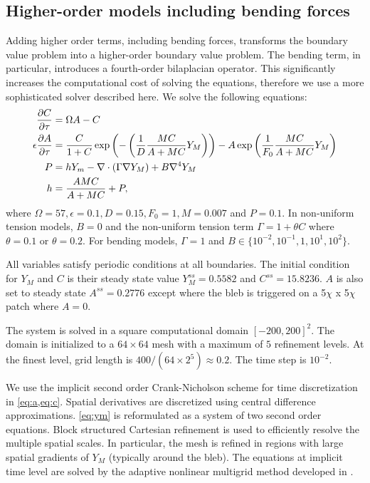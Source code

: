 \subsection{Higher-order models including bending forces}
Adding higher order terms, including bending forces, transforms the boundary value problem into a higher-order boundary value problem. The bending term, in particular, introduces a fourth-order bilaplacian operator. This significantly increases the computational cost of solving the equations, therefore we use a more sophisticated solver described here. 
We solve the following equations:
\begin{align}
\displaystyle{\frac{{\partial C}}{{\partial \tau}}}&=\Omega A-C \label{eq:c} \\
\epsilon \displaystyle{\frac{{\partial A}}{{\partial \tau}}}&=\displaystyle{\frac{{C}}{{1+C}}} \exp\left(-\left(\displaystyle{\frac{{1}}{{D}}}\displaystyle{\frac{{MC}}{{A+MC}}}Y_M\right)\right)-A\exp\left(\displaystyle{\frac{{1}}{{F_0}}}\displaystyle{\frac{{MC}}{{A+MC}}}Y_M\right) \label{eq:a} \\
P&=hY_m-\nabla\cdot(\Gamma\nabla Y_M)+B\nabla^4 Y_M \label{eq:ym} \\
h&=\displaystyle{\frac{{AMC}}{{A+MC}}}+P \label{eq:h},
\end{align}
where $\Omega=57,\epsilon=0.1,D=0.15,F_0=1,M=0.007$ and $P=0.1$. In non-uniform tension models, $B=0$ and the non-uniform tension term $\Gamma=1+\theta C$ where $\theta=0.1$ or $\theta=0.2$. For bending models, $\Gamma=1$ and $B\in\{10^{-2},10^{-1},1,10^1,10^2\}$.

All variables satisfy periodic conditions at all boundaries. The initial condition for $Y_M$ and $C$ is their steady state value $Y_M^{ss}=0.5582$ and $C^{ss}=15.8236$. $A$ is also set to steady state $A^{ss}=0.2776$ except where the bleb is triggered on a 5$\chi$ x 5$\chi$ patch where $A=0$.

The system is solved in a square computational domain $[-200,200]^2$. The domain is initialized to a $64\times 64$ mesh with a maximum of $5$ refinement levels. At the finest level, grid length is $400/(64\times 2^5)\approx 0.2$. The time step is $10^{-2}$.

We use the implicit second order Crank-Nicholson scheme for time discretization in \cref{eq:a,eq:c}. Spatial derivatives are discretized using central difference approximations. \cref{eq:ym} is reformulated as a system of two second order equations. Block structured Cartesian refinement is used to efficiently resolve the multiple spatial scales. In particular, the mesh is refined in regions with large spatial gradients of $Y_M$ (typically around the bleb). The equations at implicit time level are solved by the adaptive nonlinear multigrid method developed in \cite{wise07}.

